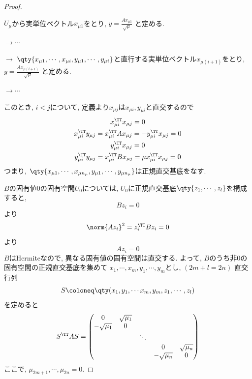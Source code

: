 \documentclass[a4paper,12pt]{jlreq}
\begin{document}
\begin{proof}
    \begin{shadebox}
    $U_{\mu}$から実単位ベクトル$x_{\mu 1}$をとり, $y = \frac{Ax_{\mu 1}}{\sqrt{\mu}}$ と定める.

    $\rightarrow \cdots $

    $\rightarrow$ $\qty{x_{\mu 1},\cdots,x_{\mu i}, y_{\mu 1},\cdots,y_{\mu i}}$と直行する実単位ベクトル$x_{\mu (i+1)}$をとり, $y = \frac{Ax_{\mu (i+1)}}{\sqrt{\mu}}$ と定める. 

    $\rightarrow \cdots $

    このとき, $i < j$について, 定義より$x_{\mu j}$は$x_{\mu i}, y_{\mu i}$と直交するので
    \begin{gather}
        x_{\mu i}^{\TT}x_{\mu j} = 0\\
        x_{\mu i}^{\TT}y_{\mu j} = x_{\mu i}^{\TT} A x_{\mu j} = - y_{\mu i}^{\TT} x_{\mu j} = 0\\
        y_{\mu i}^{\TT}x_{\mu j} = 0\\
        y_{\mu i}^{\TT}y_{\mu j} = x_{\mu i}^{\TT} B x_{\mu j} = \mu x_{\mu i}^{\TT}x_{\mu j} = 0
    \end{gather}
    つまり, $\qty{x_{\mu 1},\cdots,x_{\mu n_{\mu}}, y_{\mu 1},\cdots,y_{\mu n_{\mu}}}$は正規直交基底をなす.
    \end{shadebox}
    $B$の固有値0の固有空間$U_0$については, $U_0$に正規直交基底$\qty{z_1,\cdots,z_l}$を構成すると, 
    \begin{equation}
        B z_i = 0
    \end{equation}
    より
    \begin{equation}
        \norm{Az_i}^2 = z_i^{\TT}B z_i = 0
    \end{equation}
    より
    \begin{equation}
        A z_i = 0
    \end{equation}
    $B$はHermiteなので, 異なる固有値の固有空間は直交する.
    よって, $B$のうち非0の固有空間の正規直交基底を集めて ${x_1,\cdots,x_m, y_1,\cdots,y_m}$とし, $(2m+l=2n)$
    直交行列
    \begin{equation}
        S \coloneq \qty( x_1,y_1,\cdots x_m, y_m , z_1, \cdots ,z_l )
    \end{equation}
    を定めると
    \begin{equation}
        S^{\TT} A S = \begin{pmatrix}
            0 & \sqrt{\mu_1} & & & \\
            -\sqrt{\mu_1} & 0 & & & \\
             & & \ddots & & \\
            & & & 0 & \sqrt{\mu_n} \\
            & & & -\sqrt{\mu_n} & 0
        \end{pmatrix}
    \end{equation}
    ここで, $\mu_{2m+1},\cdots,\mu_{2n} = 0$.
\end{proof}
\end{document}
